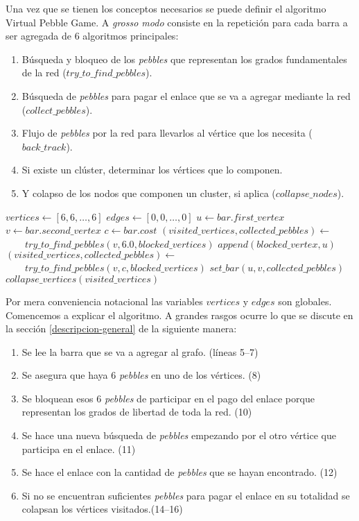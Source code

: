 Una vez que se tienen los conceptos necesarios se puede definir el algoritmo Virtual Pebble Game. A \emph{grosso modo} consiste en la repetición para cada barra a ser agregada de 6 algoritmos principales:

\begin{enumerate}
\item Búsqueda y bloqueo de los \emph{pebbles} que representan los grados fundamentales de la red ($try\_to\_find\_pebbles$).
\item Búsqueda de \emph{pebbles} para pagar el enlace que se va a agregar mediante la red ($collect\_pebbles$).
\item Flujo de \emph{pebbles} por la red para llevarlos al vértice que los necesita ($back\_track$).
\item Si existe un clúster, determinar los vértices que lo componen.
\item Y colapso de los nodos que componen un cluster, si aplica ($collapse\_nodes$).
\end{enumerate}

\begin{algorithm}
\begin{algorithmic}[1]
\State $vertices \gets [6,6,\ldots,6]$
\State $edges \gets [0,0,\ldots,0]$
		\State $u \gets bar.first\_vertex$
		\State $v \gets bar.second\_vertex$
		\State $c \gets bar.cost$
		\State $(visited\_vertices, collected\_pebbles) \gets$
		\State $\qquad try\_to\_find\_pebbles(v, 6.0, blocked\_vertices)$
		\State $append(blocked\_vertex, u)$
		\State $(visited\_vertices, collected\_pebbles) \gets$
		\State $\qquad try\_to\_find\_pebbles(v, c, blocked\_vertices)$
		\State $set\_bar(u, v, collected\_pebbles)$
			\State $collapse\_vertices(visited\_vertices)$
		\EndIf
	\EndFor
\EndFunction
\end{algorithmic}
\end{algorithm}

Por mera conveniencia notacional las variables $vertices$ y $edges$ son globales.
Comencemos a explicar el algoritmo. A grandes rasgos ocurre lo que se discute en la sección \ref{descripcion-general} de la siguiente manera:

\begin{enumerate}
	\item Se lee la barra que se va a agregar al grafo. (líneas 5--7)
	\item Se asegura que haya 6 \emph{pebbles} en uno de los vértices. (8)
	\item Se bloquean esos 6 \emph{pebbles} de participar en el pago del enlace porque representan los grados de libertad de toda la red. (10)
	\item Se hace una nueva búsqueda de \emph{pebbles} empezando por el otro vértice que participa en el enlace. (11)
	\item Se hace el enlace con la cantidad de \emph{pebbles} que se hayan encontrado. (12)
	\item Si no se encuentran suficientes \emph{pebbles} para pagar el enlace en su totalidad se colapsan los vértices visitados.(14--16)
\end{enumerate}

